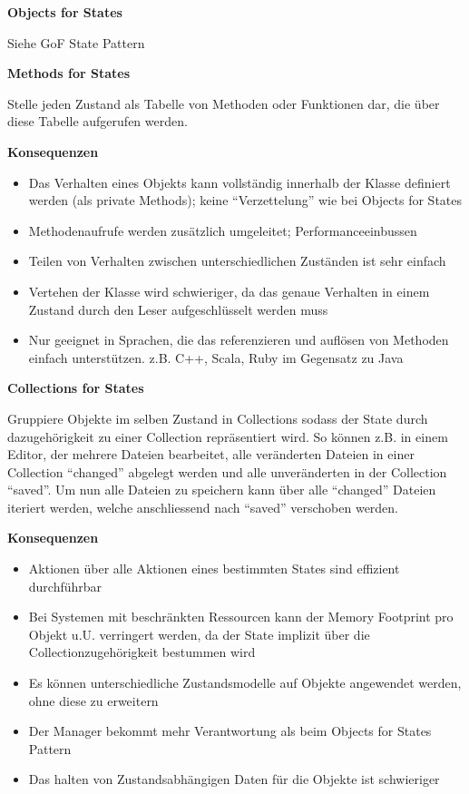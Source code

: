 \textbf{Objects for States}

Siehe GoF State Pattern

\textbf{Methods for States}

Stelle jeden Zustand als Tabelle von Methoden oder Funktionen dar, die über diese Tabelle aufgerufen werden.

\textbf{Konsequenzen}

\begin{itemize}
	\item Das Verhalten eines Objekts kann vollständig innerhalb der Klasse definiert werden (als private Methods); keine ``Verzettelung'' wie bei Objects for States
	\item Methodenaufrufe werden zusätzlich umgeleitet; Performanceeinbussen
	\item Teilen von Verhalten zwischen unterschiedlichen Zuständen ist sehr einfach
	\item Vertehen der Klasse wird schwieriger, da das genaue Verhalten in einem Zustand durch den Leser aufgeschlüsselt werden muss
	\item Nur geeignet in Sprachen, die das referenzieren und auflösen von Methoden einfach unterstützen. z.B. C++, Scala, Ruby im Gegensatz zu Java
\end{itemize}

\textbf{Collections for States}

Gruppiere Objekte im selben Zustand in Collections sodass der State durch dazugehörigkeit zu einer Collection repräsentiert wird. So können z.B. in einem Editor, der mehrere Dateien bearbeitet, alle veränderten Dateien in einer Collection ``changed'' abgelegt werden und alle unveränderten in der Collection ``saved''. Um nun alle Dateien zu speichern kann über alle ``changed'' Dateien iteriert werden, welche anschliessend nach ``saved'' verschoben werden.

\textbf{Konsequenzen}

\begin{itemize}
	\item Aktionen über alle Aktionen eines bestimmten States sind effizient durchführbar
	\item Bei Systemen mit beschränkten Ressourcen kann der Memory Footprint pro Objekt u.U. verringert werden, da der State implizit über die Collectionzugehörigkeit bestummen wird
	\item Es können unterschiedliche Zustandsmodelle auf Objekte angewendet werden, ohne diese zu erweitern
	\item Der Manager bekommt mehr Verantwortung als beim Objects for States Pattern
	\item Das halten von Zustandsabhängigen Daten für die Objekte ist schwieriger
\end{itemize}

